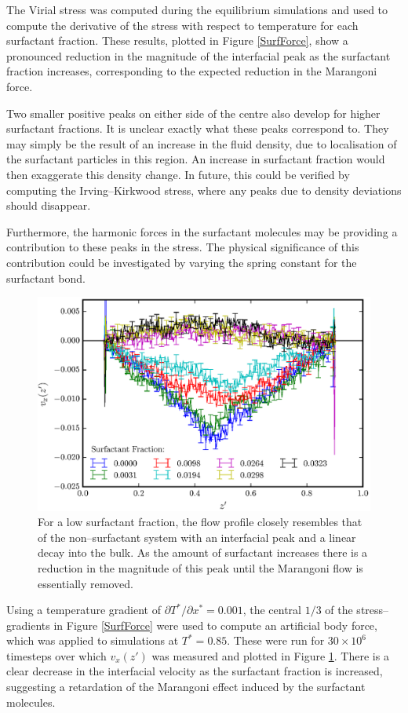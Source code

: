 The Virial stress was computed during the equilibrium simulations and used to compute the derivative of the stress with respect to temperature for each surfactant fraction.
These results, plotted in Figure \ref{SurfForce}, show a pronounced reduction in the magnitude of the interfacial peak as the surfactant fraction increases, corresponding to the expected reduction in the Marangoni force.

Two smaller positive peaks on either side of the centre also develop for higher surfactant fractions.
It is unclear exactly what these peaks correspond to.
They may simply be the result of an increase in the fluid density, due to localisation of the surfactant particles in this region. 
An increase in surfactant fraction would then exaggerate this density change.
In future, this could be verified by computing the Irving--Kirkwood stress, where any peaks due to density deviations should disappear.

Furthermore, the harmonic forces in the surfactant molecules may be providing a contribution to these peaks in the stress.
The physical significance of this contribution could be investigated by varying the spring constant for the surfactant bond.
\FloatBarrier

\begin{figure}[h]
\centering
\includegraphics[scale=0.8]{SurfFlow}
\caption{For a low surfactant fraction, the flow profile closely resembles that of the non--surfactant system with an interfacial peak and a linear decay into the bulk.
As the amount of surfactant increases there is a reduction in the magnitude of this peak until the Marangoni flow is essentially removed.
}
\label{SurfFlow}
\end{figure}
Using a temperature gradient of $\partial T^{*} / \partial x^{*} = 0.001$, the central $1/3$ of the stress--gradients in Figure \ref{SurfForce} were used to compute an artificial body force, which was applied to simulations at $T^{*}=0.85$.
These were run for $30 \times 10^{6}$ timesteps over which $v_{x}(z')$ was measured and plotted in Figure \ref{SurfFlow}.
There is a clear decrease in the interfacial velocity as the surfactant fraction is increased, suggesting a retardation of the Marangoni effect induced by the surfactant molecules.

